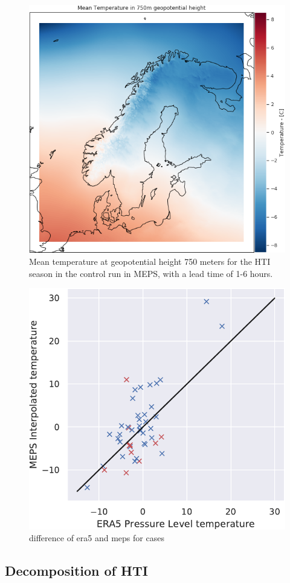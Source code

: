 \begin{figure}
    \centering
    \includegraphics[width=\textwidth]{Figures/MeanT750MEPS.png}
    \caption{Mean temperature at geopotential height 750 meters for the HTI season in the control run in MEPS, with a lead time of 1-6 hours.}
    \label{fig:MeanT750MEPS}
\end{figure}

\begin{figure}
    \centering
    \includegraphics[width=.5\textwidth]{Figures/T750MEPSera5diff.pdf}
    \caption{difference of era5 and meps for cases}
    \label{fig:eramepsdiff}
\end{figure}

\subsection{Decomposition of HTI}

